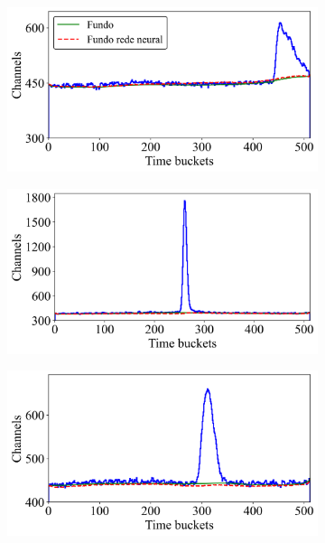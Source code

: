 \documentclass[a4paper,12pt,oneside]{book}
\begin{document}
\begin{figure}[H]
\centering
    \begin{subfigure}[b]{0.49\textwidth}
        \centering
        \includegraphics[scale=0.43]{figs/stb_1.png}
        \caption{}
        \label{subfig:stb_ex1}
    \end{subfigure}%
    \hfill
    \begin{subfigure}[b]{0.46\textwidth}
        \centering
        \includegraphics[scale=0.43]{figs/stb_2.png}
        \caption{}
        \label{subfig:stb_ex2}
    \end{subfigure}
    \begin{subfigure}[b]{0.49\textwidth}
        \centering
        \includegraphics[scale=0.43]{figs/stb_3.png}

\end{subfigure}
\end{figure}
\end{document}
